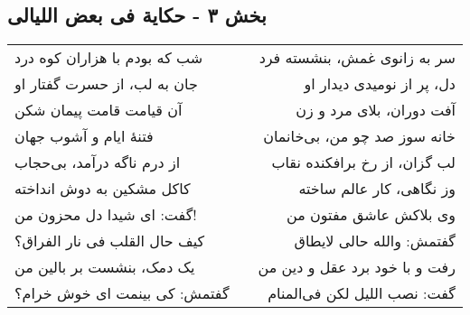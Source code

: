 \begin{center}
\section*{بخش ۳ - حکایة فی بعض اللیالی}
\label{sec:003}
\begin{longtable}{l p{0.5cm} r}
شب که بودم با هزاران کوه درد
&&
سر به زانوی غمش، بنشسته فرد
\\
جان به لب، از حسرت گفتار او
&&
دل، پر از نومیدی دیدار او
\\
آن قیامت قامت پیمان شکن
&&
آفت دوران، بلای مرد و زن
\\
فتنهٔ ایام و آشوب جهان
&&
خانه سوز صد چو من، بی‌خانمان
\\
از درم ناگه درآمد، بی‌حجاب
&&
لب گزان، از رخ برافکنده نقاب
\\
کاکل مشکین به دوش انداخته
&&
وز نگاهی، کار عالم ساخته
\\
گفت: ای شیدا دل محزون من!
&&
وی بلاکش عاشق مفتون من
\\
کیف حال القلب فی نار الفراق؟
&&
گفتمش: والله حالی لایطاق
\\
یک دمک، بنشست بر بالین من
&&
رفت و با خود برد عقل و دین من
\\
گفتمش: کی بینمت ای خوش خرام؟
&&
گفت: نصب اللیل لکن فی‌المنام
\\
\end{longtable}
\end{center}
